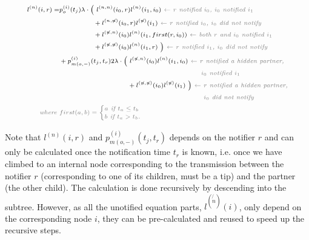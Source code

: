 \documentclass[a4paper,10pt]{article}
\begin{document}
\begin{equation}
\scriptsize
\begin{split}
l^{(n)}(i, r) = &p_o^{(i)}(t_j) \lambda \cdot
\Big(~l^{(n,n)}(i_0,r)l^{(n)}(i_1,i_0) \textit{\color{gray}~$\leftarrow$ $r$ notified $i_0$, $i_0$  notified $i_1$} \\
&~~~~~~~~~~~~~~~+ l^{(n,\not{n})}(i_0,r)l^{(\not{n})}(i_1) \textit{\color{gray}~$\leftarrow$  $r$ notified $i_0$, $i_0$ did not notify} \\
&~~~~~~~~~~~~~~~+l^{(\not{n}, n)}(i_0)l^{(n)}(i_1,first(r,i_0)) \textit{\color{gray}~$\leftarrow$ both $r$ and $i_0$ notified $i_1$} \\
&~~~~~~~~~~~~~~~+ l^{(\not{n},\not{n})}(i_0)l^{(n)}(i_1,r)~\Big) \textit{\color{gray}~$\leftarrow$ $r$ notified $i_1$, $i_0$ did not notify} 
\\
&+ p_{m(o,-)}^{(i)}(t_j,t_r) 2\lambda \cdot
\Big(~l^{(\not{n},n)}(i_0)l^{(n)}(i_1,i_0) \textit{\color{gray}~$\leftarrow$ $r$ notified a hidden partner,} \\
&\textit{\color{gray}~~~~~~~~~~~~~~~~~~~~~~~~~~~~~~~~~~~~~~~~~~~~~~~~~~~~~~~~$i_0$ notified $i_1$} \\
&~~~~~~~~~~~~~~~~~~~~~~~~~~~~~~+ l^{(\not{n},\not{n})}(i_0)l^{(\not{n})}(i_1)~\Big) \textit{\color{gray}~$\leftarrow$ $r$ notified a hidden partner,} \\
&\textit{\color{gray}~~~~~~~~~~~~~~~~~~~~~~~~~~~~~~~~~~~~~~~~~~~~~~~~~~~~~~~~ $i_0$ did not notify}\\
\textit{\color{gray}~where } &\color{gray}first(a,b) = 
\begin{cases}
a \textit{~if $t_a \leq t_b$}\\
b \textit{~if $t_a > t_b$.}
\end{cases} 
 \end{split}
\label{eq:lp-tip-int}
\end{equation}


Note that $l^{(n)}(i, r)$ and $p_{m(o,-)}^{(i)}(t_j,t_r)$ depends on the notifier $r$ and can only be calculated once the notification time $t_r$ is known, i.e. once we have climbed to an internal node corresponding to the transmission between the notifier $r$ (corresponding to one of its children, must be a tip) and the partner (the other child). The calculation is done recursively by descending into the subtree. However, as all the unotified equation parts, $l^{(\not{n})}(i)$, only depend on the corresponding node $i$, they can be pre-calculated and reused to speed up the recursive steps.
\end{document}
